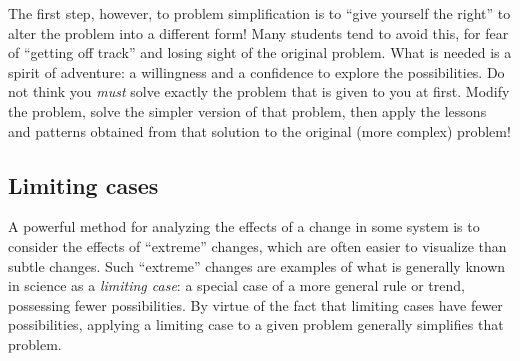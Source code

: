 The first step, however, to problem simplification is to ``give yourself the right'' to alter the problem into a different form!  Many students tend to avoid this, for fear of ``getting off track'' and losing sight of the original problem.  What is needed is a spirit of adventure: a willingness and a confidence to explore the possibilities.  Do not think you \textit{must} solve exactly the problem that is given to you at first.  Modify the problem, solve the simpler version of that problem, then apply the lessons and patterns obtained from that solution to the original (more complex) problem! 

















\filbreak
\subsection{Limiting cases}

A powerful method for analyzing the effects of a change in some system is to consider the effects of ``extreme'' changes, which are often easier to visualize than subtle changes.  Such ``extreme'' changes are examples of what is generally known in science as a \textit{limiting case}: a special case of a more general rule or trend, possessing fewer possibilities.  By virtue of the fact that limiting cases have fewer possibilities, applying a limiting case to a given problem generally simplifies that problem.  


